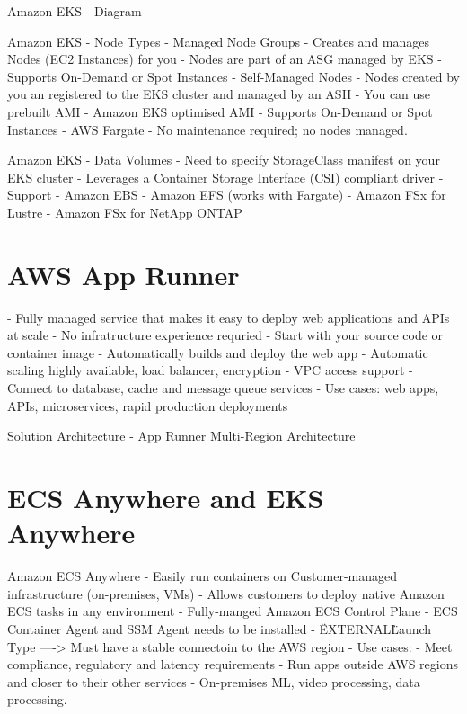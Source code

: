 \documentclass[11pt]{book}
\begin{document}
    Amazon EKS - Diagram

    Amazon EKS - Node Types
    - Managed Node Groups
        - Creates and manages Nodes (EC2 Instances) for you
        - Nodes are part of an ASG managed by EKS
        - Supports On-Demand or Spot Instances
    - Self-Managed Nodes
        - Nodes created by you an registered to the EKS cluster and managed by an ASH
        - You can use prebuilt AMI - Amazon EKS optimised AMI
        - Supports On-Demand or Spot Instances
    - AWS Fargate
        - No maintenance required; no nodes managed.

    Amazon EKS - Data Volumes
    - Need to specify StorageClass manifest on your EKS cluster
    - Leverages a Container Storage Interface (CSI) compliant driver
    - Support
        - Amazon EBS
        - Amazon EFS (works with Fargate)
        - Amazon FSx for Lustre
        - Amazon FSx for NetApp ONTAP

    \section{AWS App Runner}
    - Fully managed service that makes it easy to deploy web applications and APIs at scale
    - No infratructure experience requried
    - Start with your source code or container image
    - Automatically builds and deploy the web app
    - Automatic scaling highly available, load balancer, encryption
    - VPC access support
    - Connect to database, cache and message queue services
    - Use cases: web apps, APIs, microservices, rapid production deployments


    Solution Architecture - App Runner Multi-Region Architecture

    \section{ECS Anywhere and EKS Anywhere}
    Amazon ECS Anywhere
    - Easily run containers on Customer-managed infrastructure (on-premises, VMs)
    - Allows customers to deploy native Amazon ECS tasks in any environment
    - Fully-manged Amazon ECS Control Plane
    - ECS Container Agent and SSM Agent needs to be installed
    - \"EXTERNAL\" Launch Type
    ----> Must have a stable connectoin to the AWS region
    - Use cases:
        - Meet compliance, regulatory and latency requirements
        - Run apps outside AWS regions and closer to their other services
        - On-premises ML, video processing, data processing.
\end{document}
